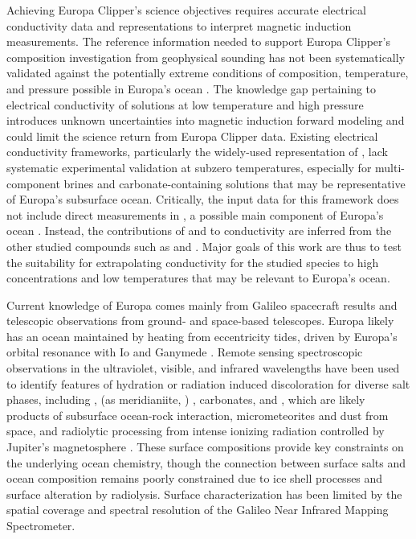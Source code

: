 \documentclass[journal=aesccq,manuscript=article]{achemso}
\begin{document}
Achieving Europa Clipper's science objectives requires accurate electrical conductivity data and representations to interpret magnetic induction measurements.
The reference information needed to support Europa Clipper's composition investigation from geophysical sounding has not been systematically validated against the potentially extreme conditions of composition, temperature, and pressure possible in Europa's ocean \cite{vance2021magnetic}. 
The knowledge gap pertaining to electrical conductivity of solutions at low temperature and high pressure introduces unknown uncertainties into magnetic induction forward modeling and could limit the science return from Europa Clipper data.
Existing electrical conductivity frameworks, particularly the widely-used representation of \citet{McCleskey2012}, lack systematic experimental validation at subzero temperatures, especially for multi-component brines and carbonate-containing solutions that may be representative of Europa's subsurface ocean\citep{castillorogez2022contribution}. 
Critically, the input data for this framework does not include direct measurements in , a possible main component of Europa's ocean \cite{melwani2021metamorphic}. 
Instead, the contributions of  and  to conductivity are inferred from the other studied compounds such as  and  \cite{McCleskey_2011}.
Major goals of this work are thus to test the suitability for extrapolating conductivity for  the studied species to high concentrations and low temperatures that may be relevant to Europa's ocean.

Current knowledge of Europa comes mainly from Galileo spacecraft results and telescopic observations from ground- and space-based telescopes.
Europa likely has an ocean maintained by heating from eccentricity tides, driven by Europa’s orbital resonance with Io and Ganymede \cite{behounkova2021tidally}. 
Remote sensing spectroscopic observations in the ultraviolet, visible, and infrared wavelengths have been used to identify features of hydration or radiation induced discoloration for diverse salt phases, including ,  (as meridianiite, ) , carbonates, and , which are likely products of subsurface ocean-rock interaction, micrometeorites and dust from space, and radiolytic processing from intense ionizing radiation controlled by Jupiter's magnetosphere \cite{McCord1999HydratedSalts,carlson2009europa,trumbo2019sodium,trumbo2023distribution,becker2024exploring}. 
These surface compositions provide key constraints on the underlying ocean chemistry, though the connection between surface salts and ocean composition remains poorly constrained due to ice shell processes and surface alteration by radiolysis. 
Surface characterization has been limited by the spatial coverage and spectral resolution of the Galileo Near Infrared Mapping Spectrometer.
\end{document}
